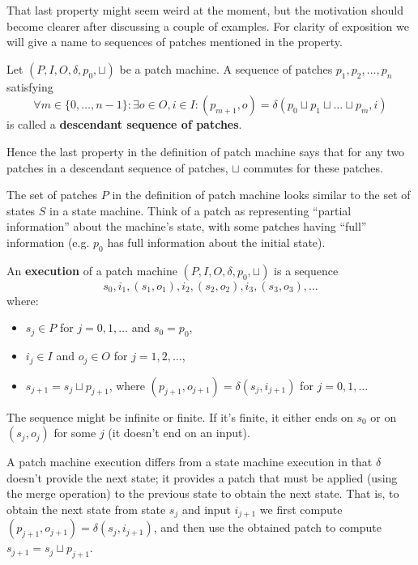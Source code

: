 \documentclass[12pt,a4paper,en]{pracamgr}
\newcommand{\tb}[1]{\textbf{#1}}
\begin{document}
That last property might seem weird at the moment, but the motivation should become clearer after discussing a couple of examples. For clarity of exposition we will give a name to sequences of patches mentioned in the property.

\begin{defin}
	Let $(P, I, O, \delta, p_0, \sqcup)$ be a patch machine. A sequence of patches $ p_1, p_2, \dots, p_n $ satisfying
	$$ \forall m \in \{0, \dots, n-1\}: \exists o \in O, i \in I: (p_{m+1}, o) = \delta(p_0 \sqcup p_1 \sqcup \dots \sqcup p_m, i) $$
	is called a \tb{descendant sequence of patches}.
\end{defin}

Hence the last property in the definition of patch machine says that for any two patches in a descendant sequence of patches, $\sqcup$ commutes for these patches.

The set of patches $P$ in the definition of patch machine looks similar to the set of states $S$ in a state machine. Think of a patch as representing ``partial information'' about the machine's state, with some patches having ``full'' information (e.g. $p_0$ has full information about the initial state).

\begin{defin}
	An \tb{execution} of a patch machine $(P, I, O, \delta, p_0, \sqcup)$ is a sequence
	$$ s_0, i_1, (s_1, o_1), i_2, (s_2, o_2), i_3, (s_3, o_3), \dots $$
	where:
	\begin{itemize}
		\item $s_j \in P$ for $j = 0, 1, \dots$ and $s_0 = p_0$,
		\item $i_j \in I$ and $o_j \in O$ for $j = 1, 2, \dots$,
		\item $s_{j+1} = s_j \sqcup p_{j+1}$, where $(p_{j+1}, o_{j+1}) = \delta(s_j, i_{j+1})$ for $j = 0, 1, \dots$
	\end{itemize}

	The sequence might be infinite or finite. If it's finite, it either ends on $s_0$ or on $(s_j, o_j)$ for some $j$ (it doesn't end on an input).
\end{defin}

A patch machine execution differs from a state machine execution in that $\delta$ doesn't provide the next state; it provides a patch that must be applied (using the merge operation) to the previous state to obtain the next state. That is, to obtain the next state from state $s_j$ and input $i_{j+1}$ we first compute $(p_{j+1}, o_{j+1}) = \delta(s_j, i_{j+1})$, and then use the obtained patch to compute $s_{j+1} = s_j \sqcup p_{j+1}$.
\end{document}
